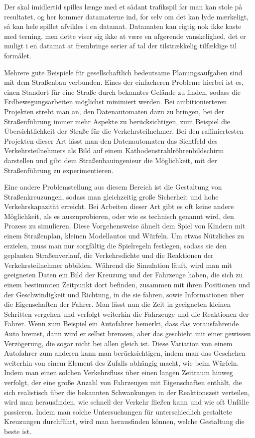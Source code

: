 {Der skal imidlertid spilles længe med et sådant trafikspil før man kan stole på resultatet, og her kommer datamaterne ind, for selv om det kan lyde mærkeligt, så kan hele spillet afvikles i en datamat. Datamaten kan rigtig nok ikke kaste med terning, men dette viser sig ikke at være en afgørende vanskelighed, det er muligt i en datamat at frembringe serier af tal der tilstrækkelig tilfældige til formålet. 
}{
Mehrere gute Beispiele für gesellschaftlich bedeutsame Planungsaufgaben sind mit dem Straßenbau verbunden. Eines der einfacheren Probleme hierbei ist es, einen Standort für eine Straße durch bekanntes Gelände zu finden, sodass die Erdbewegungsarbeiten möglichst minimiert werden. Bei ambitionierteren Projekten strebt man an, den Datenautomaten dazu zu bringen, bei der Straßenführung immer mehr Aspekte zu berücksichtigen, zum Beispiel die Übersichtlichkeit der Straße für die Verkehrsteilnehmer. Bei den raffiniertesten Projekten dieser Art lässt man den Datenautomaten das Sichtfeld des Verkehrsteilnehmers als Bild auf einem Kathodenstrahlröhrenbildschirm darstellen und gibt dem Straßenbauingenieur die Möglichkeit, mit der Straßenführung zu experimentieren.

Eine andere Problemstellung aus diesem Bereich ist die Gestaltung von Straßenkreuzungen, sodass man gleichzeitig große Sicherheit und hohe Verkehrskapazität erreicht. Bei Arbeiten dieser Art gibt es oft keine andere Möglichkeit, als es auszuprobieren, oder wie es technisch genannt wird, den Prozess zu simulieren. Diese Vorgehensweise ähnelt dem Spiel von Kindern mit einem Straßenplan, kleinen Modellautos und Würfeln. Um etwas Nützliches zu erzielen, muss man nur sorgfältig die Spielregeln festlegen, sodass sie den geplanten Straßenverlauf, die Verkehrsdichte und die Reaktionen der Verkehrsteilnehmer abbilden. Während die Simulation läuft, wird man mit geeigneten Daten ein Bild der Kreuzung und der Fahrzeuge haben, die sich zu einem bestimmten Zeitpunkt dort befinden, zusammen mit ihren Positionen und der Geschwindigkeit und Richtung, in die sie fahren, sowie Informationen über die Eigenschaften der Fahrer. Man lässt nun die Zeit in geeigneten kleinen Schritten vergehen und verfolgt weiterhin die Fahrzeuge und die Reaktionen der Fahrer. Wenn zum Beispiel ein Autofahrer bemerkt, dass das vorausfahrende Auto bremst, dann wird er selbst bremsen, aber das geschieht mit einer gewissen Verzögerung, die sogar nicht bei allen gleich ist. Diese Variation von einem Autofahrer zum anderen kann man berücksichtigen, indem man das Geschehen weiterhin von einem Element des Zufalls abhängig macht, wie beim Würfeln. Indem man einen solchen Verkehrsfluss über einen langen Zeitraum hinweg verfolgt, der eine große Anzahl von Fahrzeugen mit Eigenschaften enthält, die sich realistisch über die bekannten Schwankungen in der Reaktionszeit verteilen, wird man herausfinden, wie schnell der Verkehr fließen kann und wie oft Unfälle passieren. Indem man solche Untersuchungen für unterschiedlich gestaltete Kreuzungen durchführt, wird man herausfinden können, welche Gestaltung die beste ist.

}
